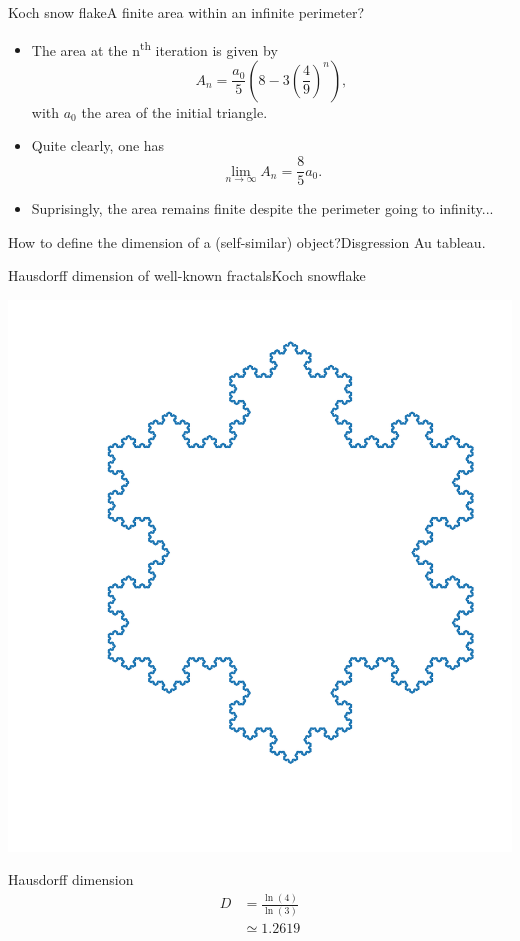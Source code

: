 \documentclass[usenames,dvipsnames,svgnames,10pt,aspectratio=169]{beamer}
\begin{document}
\begin{frame}[t, c]{Koch snow flake}{A finite area within an infinite perimeter?}
	\begin{itemize}
		\item The area at the n\textsuperscript{th} iteration is given by
		$$
		A_n = \displaystyle \frac{a_0}{5} \left( 8 - 3 \left( \frac{4}{9} \right)^n \right),
		$$
		with $a_0$ the area of the initial triangle.
		\medskip
		\item Quite clearly, one has
		$$
		\lim_{n \to \infty} A_n = \displaystyle \frac{8}{5} a_0.
		$$
		\item Suprisingly, the area remains finite despite the perimeter going to infinity...
	\end{itemize}

	\vspace{1cm}
\end{frame}

\begin{frame}[t, c]{How to define the dimension of a (self-similar) object?}{Disgression}
	\centering
	\Large{Au tableau.}

	\vspace{1cm}
\end{frame}

\begin{frame}[t, c]{Hausdorff dimension of well-known fractals}{Koch snowflake}
	\begin{minipage}{.48\textwidth}
		\centering
		\includegraphics[width=.8\columnwidth]{koch_7_it}
	\end{minipage}%
	\hfill
	\begin{minipage}{.48\textwidth}
		\centering
		Hausdorff dimension
		$$
		\begin{aligned}
			D & = \displaystyle \frac{\ln(4)}{\ln(3)} \\
			& \simeq 1.2619
		\end{aligned}
		$$
	\end{minipage}
	\vspace{1cm}
\end{frame}
\end{document}
